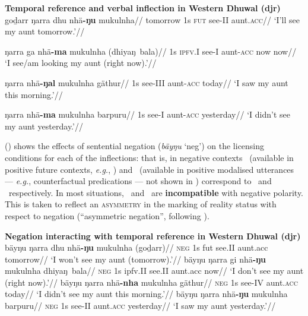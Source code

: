 \pex \textbf{Temporal reference and verbal inflection in Western Dhuwal (\gls{djr})}
\a\begingl
\gla {}goḏarr ŋarra dhu nhä\textbf{-ŋu} mukulnha//
\glb tomorrow 1s \textsc{fut} see-\gls{II} aunt.\textsc{acc}//
\glft`I'll see my aunt tomorrow.'//\endgl

\a\begingl\gla {}ŋarra ga nhä\textbf{-ma} mukulnha (dhiyaŋ~bala)//
\glb  1s \textsc{ipfv.\gls{I}} see-\gls{I} aunt-\textsc{acc} now now//
\glft`I see/am looking my aunt (right now).'//\endgl


\a\begingl\gla  {}ŋarra nhä\textbf{-ŋal} mukulnha gäthur//
\glb 1s see-\gls{III} aunt-\textsc{acc} today//
\glft`I saw my aunt this morning.'//\endgl 

\a\begingl\gla {}ŋarra nhä\textbf{-ma} mukulnha barpuru//
\glb 1s see-\gls{I} aunt-\textsc{acc} yesterday//
\glft`I didn't see my aunt yesterday.'//\endgl\xe


() shows the effects of sentential negation (\textit{bäyŋu} `\gls{neg}') on the licensing conditions for each of the inflections: that is, in negative contexts \II\ (available in positive future contexts, \textit{e.g.}, \textit{}) and \IV\ (available in positive modalised utterances --- \textit{e.g.}, counterfactual predications --- not shown in ) correspond to \I\ and \III\ respectively. In most situations, \I~and \III~are \textbf{incompatible} with negative polarity. This is taken to reflect an \textsc{asymmetry} in the marking of reality status with respect to negation (``asymmetric negation'', following \citealp{Miestamo2005}).

\pex \textbf{Negation interacting with temporal reference in Western Dhuwal (\gls{djr})}
\a\begingl
\gla {}bäyŋu ŋarra dhu nhä\textbf{-ŋu} mukulnha (goḏarr)//
\glb \textsc{neg} 1s \gls{fut} see.\gls{II} aunt.\gls{acc} tomorrow//
\glft`I won't see my aunt (tomorrow).'//\endgl
\a {}\begingl\gla bäyŋu ŋarra gi nhä\textbf{-ŋu} mukulnha dhiyaŋ~bala//
\glb \textsc{neg} 1s \gls{ipfv}.\gls{II} see.\gls{II} aunt.\gls{acc} now//
\glft`I don't see my aunt (right now).'//\endgl
\a\begingl\gla {}bäyŋu ŋarra nhä\textbf{-nha} mukulnha gäthur//
\glb \textsc{neg} 1s see-\gls{IV} aunt.\textsc{acc} today//
\glft`I didn't see my aunt this morning.'//\endgl
\a\begingl\gla{}bäyŋu ŋarra nhä\textbf{-ŋu} mukulnha barpuru//
\glb \textsc{neg} 1s see-\gls{II} aunt.\textsc{acc} yesterday//
\glft`I saw my aunt yesterday.'//\endgl
\xe 





